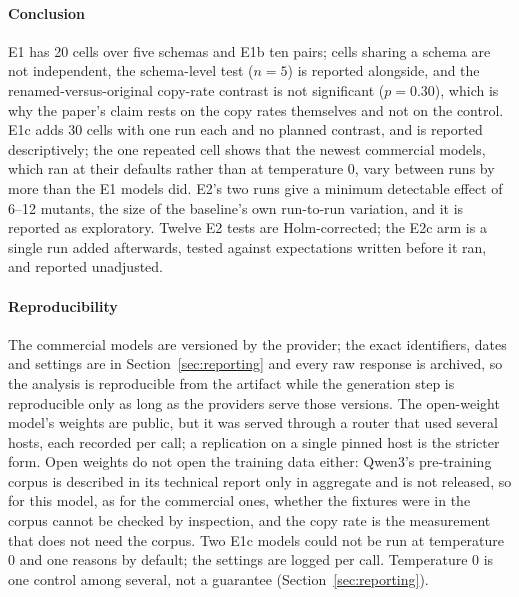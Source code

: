 \documentclass[preprint,12pt]{elsarticle}
\begin{document}
\paragraph{Conclusion} E1 has 20 cells over five schemas and E1b ten pairs; cells sharing a schema are not independent, the schema-level test ($n=5$) is reported alongside, and the renamed-versus-original copy-rate contrast is not significant ($p=0.30$), which is why the paper's claim rests on the copy rates themselves and not on the control. E1c adds 30 cells with one run each and no planned contrast, and is reported descriptively; the one repeated cell shows that the newest commercial models, which ran at their defaults rather than at temperature 0, vary between runs by more than the E1 models did. E2's two runs give a minimum detectable effect of 6--12 mutants, the size of the baseline's own run-to-run variation, and it is reported as exploratory. Twelve E2 tests are Holm-corrected; the E2c arm is a single run added afterwards, tested against expectations written before it ran, and reported unadjusted.
\paragraph{Reproducibility} The commercial models are versioned by the provider; the exact identifiers, dates and settings are in Section~\ref{sec:reporting} and every raw response is archived, so the analysis is reproducible from the artifact while the generation step is reproducible only as long as the providers serve those versions. The open-weight model's weights are public, but it was served through a router that used several hosts, each recorded per call; a replication on a single pinned host is the stricter form. Open weights do not open the training data either: Qwen3's pre-training corpus is described in its technical report only in aggregate and is not released, so for this model, as for the commercial ones, whether the fixtures were in the corpus cannot be checked by inspection, and the copy rate is the measurement that does not need the corpus. Two E1c models could not be run at temperature 0 and one reasons by default; the settings are logged per call. Temperature 0 is one control among several, not a guarantee (Section~\ref{sec:reporting}).
\end{document}
